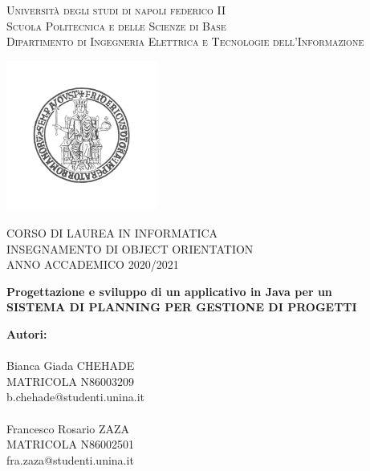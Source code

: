 \documentclass[a4paper,11pt]{report}
\begin{document}
	\begin{titlepage}

		\center

		\textsc{
			\LARGE
			Università degli studi di napoli federico II\\
			Scuola Politecnica e delle Scienze di Base\\
			\Large
			Dipartimento di Ingegneria Elettrica e Tecnologie dell'Informazione\\
		}

		\includegraphics[width = 140pt]{IMGs/Logo_unina.png}

		\textsc{
			\normalsize
			CORSO DI LAUREA IN INFORMATICA\\
			INSEGNAMENTO DI OBJECT ORIENTATION\\
			ANNO ACCADEMICO 2020/2021\\			
		}

		\vspace{4cm}

		\Huge
		\textbf{
			Progettazione e sviluppo di un applicativo in Java per un\\
			SISTEMA DI PLANNING PER GESTIONE DI PROGETTI
		}
		
		\vspace{6cm}


		\begin{minipage}[t]{0.4\textwidth}

			\begin{flushleft}

				\Large
				\textbf{Autori:}\\
				~\\
				\large
				Bianca Giada CHEHADE\\
				MATRICOLA N86003209\\
				b.chehade@studenti.unina.it\\
				~\\
				Francesco Rosario ZAZA\\
				MATRICOLA N86002501\\
				fra.zaza@studenti.unina.it\\


\end{flushleft}
\end{minipage}
\end{titlepage}
\end{document}
